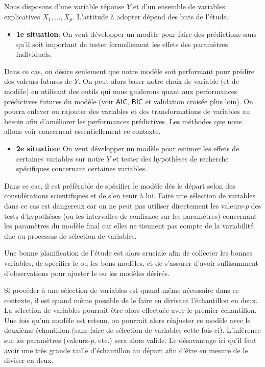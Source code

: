 \documentclass[
  11pt,
  letterpaper,
]{scrbook}
\providecommand{\tightlist}{%
  \setlength{\itemsep}{0pt}\setlength{\parskip}{0pt}}\usepackage{longtable,booktabs,array}
\theoremstyle{definition}
\theoremstyle{remark}
\begin{document}
Nous disposons d'une variable réponse \(Y\) et d'un ensemble de
variables explicatives \(X_1, \ldots, X_p\). L'attitude à adopter dépend
des buts de l'étude.

\begin{itemize}
\tightlist
\item
  \textbf{1e situation}: On veut développer un modèle pour faire des
  prédictions sans qu'il soit important de tester formellement les
  effets des paramètres individuels.
\end{itemize}

Dans ce cas, on désire seulement que notre modèle soit performant pour
prédire des valeurs futures de \(Y\). On peut alors baser notre choix de
variable (et de modèle) en utilisant des outils qui nous guiderons quant
aux performances prédictives futures du modèle (voir \(\mathsf{AIC}\),
\(\mathsf{BIC}\) et validation croisée plus loin). On pourra enlever ou
rajouter des variables et des transformations de variables au besoin
afin d'améliorer les performances prédictives. Les méthodes que nous
allons voir concernent essentiellement ce contexte.

\begin{itemize}
\tightlist
\item
  \textbf{2e situation}: On veut développer un modèle pour estimer les
  effets de certaines variables sur notre \(Y\) et tester des hypothèses
  de recherche spécifiques concernant certaines variables.
\end{itemize}

Dans ce cas, il est préférable de spécifier le modèle dès le départ
selon des considérations scientifiques et de s'en tenir à lui. Faire une
sélection de variables dans ce cas est dangereux car on ne peut pas
utiliser directement les valeurs-\emph{p} des tests d'hypothèses (ou les
intervalles de confiance sur les paramètres) concernant les paramètres
du modèle final car elles ne tiennent pas compte de la variabilité due
au processus de sélection de variables.

Une bonne planification de l'étude est alors cruciale afin de collecter
les bonnes variables, de spécifier le ou les bons modèles, et de
s'assurer d'avoir suffisamment d'observations pour ajuster le ou les
modèles désirés.

Si procéder à une sélection de variables est quand même nécessaire dans
ce contexte, il est quand même possible de le faire en divisant
l'échantillon en deux. La sélection de variables pourrait être alors
effectuée avec le premier échantillon. Une fois qu'un modèle est retenu,
on pourrait alors réajuster ce modèle avec le deuxième échantillon (sans
faire de sélection de variables cette fois-ci). L'inférence sur les
paramètres (valeurs-\emph{p}, etc.) sera alors valide. Le désavantage
ici qu'il faut avoir une très grande taille d'échantillon au départ afin
d'être en mesure de le diviser en deux.
\end{document}
